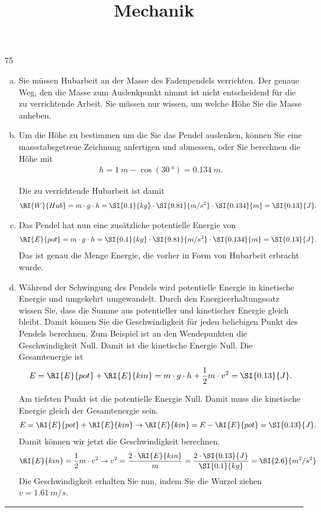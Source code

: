 \documentclass[12pt,a4paper,twoside]{article}
\title{Mechanik}
\date{}
\begin{document}
\begin{ex@loesung}{75}
\begin{enumerate}[a)]
\item Sie müssen Hubarbeit an der Masse des Fadenpendels verrichten.
Der genaue Weg, den die Masse zum Auslenkpunkt nimmt ist nicht entscheidend für die zu verrichtende Arbeit.
Sie müssen nur wissen, um welche Höhe Sie die Masse anheben.
\item Um die Höhe zu bestimmen um die Sie das Pendel auslenken, können Sie eine massstabsgetreue Zeichnung anfertigen und abmessen,
oder Sie berechnen die Höhe mit
\begin{eqnarray*}
h=\SI{1}{m} - \cos(\SI{30}{\degree}) = \SI{0.134}{m}\text{.}
\end{eqnarray*}

Die zu verrichtende Hubarbeit ist damit
\begin{eqnarray*}
\RI{W}{Hub} = m\cdot g\cdot h =\SI{0.1}{kg}\cdot\SI{9.81}{m/s^2}\cdot\SI{0.134}{m} =\SI{0.13}{J}\text{.}
\end{eqnarray*}
\item Das Pendel hat nun eine zusätzliche potentielle Energie von
\begin{eqnarray*}
\RI{E}{pot} = m\cdot g\cdot h =\SI{0.1}{kg}\cdot\SI{9.81}{m/s^2}\cdot\SI{0.134}{m} =\SI{0.13}{J}\text{.}
\end{eqnarray*}
Das ist genau die Menge Energie, die vorher in Form von Hubarbeit erbracht wurde.
\item Während der Schwingung des Pendels wird potentielle Energie in kinetische Energie und umgekehrt umgewandelt.
Durch den Energieerhaltungssatz wissen Sie, dass die Summe aus potentieller und kinetischer Energie gleich
bleibt. Damit können Sie die Geschwindigkeit für jeden beliebigen Punkt des Pendels berechnen.
Zum Beispiel ist an den Wendepunkten die Geschwindigkeit Null. Damit ist die kinetische Energie Null. Die Gesamtenergie ist
\begin{eqnarray*}
E =\RI{E}{pot} + \RI{E}{kin} = m\cdot g\cdot h + \frac{1}{2} m\cdot v^2 = \SI{0.13}{J}\text{.}
\end{eqnarray*}

Am tiefsten Punkt ist die potentielle Energie Null. Damit muss die kinetische Energie gleich der Gesamtenergie sein.
\begin{eqnarray*}
E =\RI{E}{pot} + \RI{E}{kin} \to \RI{E}{kin} = E - \RI{E}{pot}= \SI{0.13}{J}\text{.}
\end{eqnarray*}
Damit können wir jetzt die Geschwindigkeit berechnen.
\begin{eqnarray*}
\RI{E}{kin} =\frac{1}{2} m\cdot v^2 \to v^2 =\frac{2 \cdot\RI{E}{kin}}{m}=\frac{2\cdot\SI{0.13}{J}}{\SI{0.1}{kg}} = \SI{2.6}{m^2/s^2}
\end{eqnarray*}
Die Geschwindigkeit erhalten Sie nun, indem Sie die Wurzel ziehen $v=\SI{1.61}{m/s}$.


\end{enumerate}
\hrule \end{ex@loesung}
\end{document}
